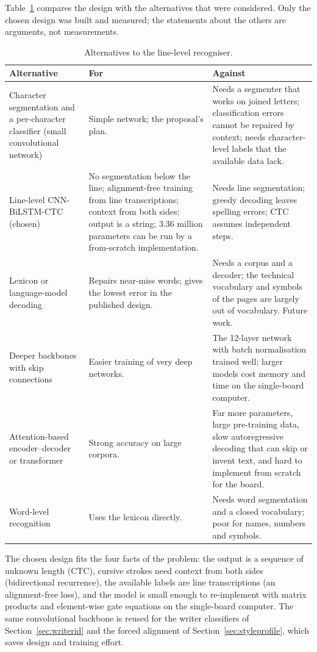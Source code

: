Table~\ref{tab:rec-alt} compares the design with the alternatives that were considered.
Only the chosen design was built and measured; the statements about the others are arguments, not measurements.

\begin{table}[h]
\centering
\fontsize{9.5}{11.5}\selectfont
\begin{tabularx}{\linewidth}{|p{3.2cm}|X|X|}
\hline
\textbf{Alternative} & \textbf{For} & \textbf{Against} \\
\hline
Character segmentation and a per-character classifier (small convolutional network) &
Simple network; the proposal's plan. &
Needs a segmenter that works on joined letters; classification errors cannot be repaired by context; needs character-level labels that the available data lack. \\
\hline
Line-level CNN-BiLSTM-CTC (chosen) &
No segmentation below the line; alignment-free training from line transcriptions; context from both sides; output is a string; 3.36 million parameters can be run by a from-scratch implementation. &
Needs line segmentation; greedy decoding leaves spelling errors; CTC assumes independent steps. \\
\hline
Lexicon or language-model decoding &
Repairs near-miss words; gives the lowest error in the published design. &
Needs a corpus and a decoder; the technical vocabulary and symbols of the pages are largely out of vocabulary. Future work. \\
\hline
Deeper backbones with skip connections &
Easier training of very deep networks. &
The 12-layer network with batch normalisation trained well; larger models cost memory and time on the single-board computer. \\
\hline
Attention-based encoder--decoder or transformer &
Strong accuracy on large corpora. &
Far more parameters, large pre-training data, slow autoregressive decoding that can skip or invent text, and hard to implement from scratch for the board. \\
\hline
Word-level recognition &
Uses the lexicon directly. &
Needs word segmentation and a closed vocabulary; poor for names, numbers and symbols. \\
\hline
\end{tabularx}
\caption{Alternatives to the line-level recogniser.}
\label{tab:rec-alt}
\end{table}


The chosen design fits the four facts of the problem: the output is a sequence of unknown length (CTC), cursive strokes need context from both sides (bidirectional recurrence), the available labels are line transcriptions (an alignment-free loss), and the model is small enough to re-implement with matrix products and element-wise gate equations on the single-board computer.
The same convolutional backbone is reused for the writer classifiers of Section~\ref{sec:writerid} and the forced alignment of Section~\ref{sec:styleprofile}, which saves design and training effort.
